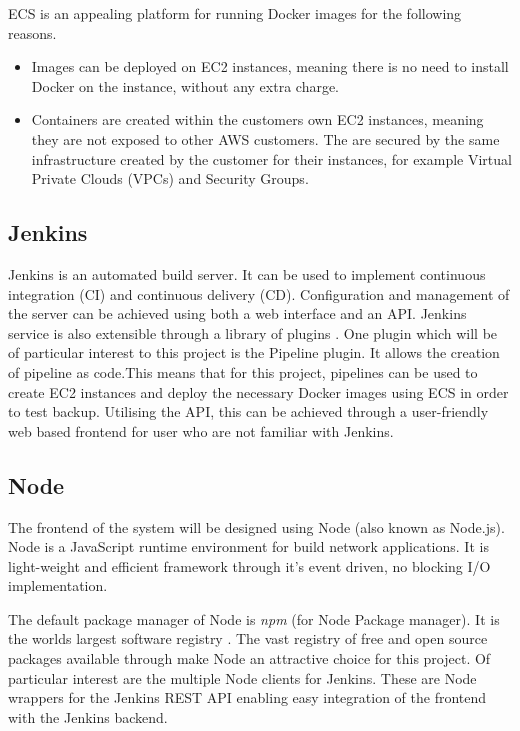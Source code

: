 ECS is an appealing platform for running Docker images for the following reasons.
\begin{itemize}
	\item Images can be deployed on EC2 instances, meaning there is no need to install Docker on the instance, without any extra charge.
	\item Containers are created within the customers own EC2 instances, meaning they are not exposed to other AWS customers. The are secured by the same infrastructure created by the customer for their instances, for example Virtual Private Clouds (VPCs) and Security Groups.
	
\end{itemize}


\subsection{Jenkins}
Jenkins is an automated build server. It can be used to implement continuous integration (CI) and continuous delivery (CD). Configuration and management of the server can be achieved using both a web interface and an API. Jenkins service is also extensible through a library of plugins \citep{jenkins}. One plugin which will be of particular interest to this project is the Pipeline plugin. It allows the creation of pipeline as code.This means that for this project, pipelines can be used to create EC2 instances and deploy the necessary Docker images using ECS in order to test backup. Utilising the API, this can be achieved through a user-friendly web based frontend for user who are not familiar with Jenkins.

\subsection{Node}
The frontend of the system will be designed using Node (also known as Node.js). Node is a JavaScript runtime environment for build network applications. It is light-weight and efficient framework through it's event driven, no blocking I/O implementation. 

The default package manager of Node is \textit{npm} (for Node Package manager). It is the worlds largest software registry \citep{npm}. The vast registry of free and open source packages available through make Node an attractive choice for this project. Of particular interest are the multiple Node clients for Jenkins. These are Node wrappers for the Jenkins REST API enabling easy integration of the frontend with the Jenkins backend.

